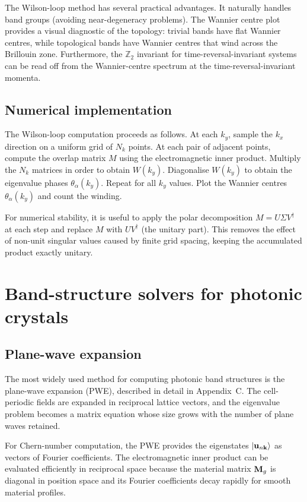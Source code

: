 The Wilson-loop method has several practical advantages.  It naturally
handles band groups (avoiding near-degeneracy problems).  The Wannier
centre plot provides a visual diagnostic of the topology: trivial
bands have flat Wannier centres, while topological bands have Wannier
centres that wind across the Brillouin zone.  Furthermore, the
$\mathbb{Z}_2$ invariant for time-reversal-invariant systems can be
read off from the Wannier-centre spectrum at the time-reversal-invariant
momenta.

\subsection{Numerical implementation}
\label{sec:ch10-wilson-impl}

The Wilson-loop computation proceeds as follows.  At each $k_y$, sample
the $k_x$ direction on a uniform grid of $N_k$ points.  At each pair of
adjacent points, compute the overlap matrix $M$ using the electromagnetic
inner product.  Multiply the $N_k$ matrices in order to obtain $W(k_y)$.
Diagonalise $W(k_y)$ to obtain the eigenvalue phases
$\theta_\alpha(k_y)$.  Repeat for all $k_y$ values.  Plot the Wannier
centres $\theta_\alpha(k_y)$ and count the winding.

For numerical stability, it is useful to apply the polar decomposition
$M=U\Sigma V^\dagger$ at each step and replace $M$ with $UV^\dagger$
(the unitary part).  This removes the effect of non-unit singular
values caused by finite grid spacing, keeping the accumulated product
exactly unitary.

\section{Band-structure solvers for photonic crystals}
\label{sec:ch10-solvers}

\subsection{Plane-wave expansion}
\label{sec:ch10-pwe}

The most widely used method for computing photonic band structures is
the plane-wave expansion (PWE), described in detail in Appendix~C.
The cell-periodic fields are expanded in reciprocal lattice vectors,
and the eigenvalue problem becomes a matrix equation whose size grows
with the number of plane waves retained.

For Chern-number computation, the PWE provides the eigenstates
$|\mathbf{u}_{n\mathbf{k}}\rangle$ as vectors of Fourier coefficients.
The electromagnetic inner product can be evaluated efficiently in
reciprocal space because the material matrix $\mathbf{M}_g$ is diagonal
in position space and its Fourier coefficients decay rapidly for
smooth material profiles.


